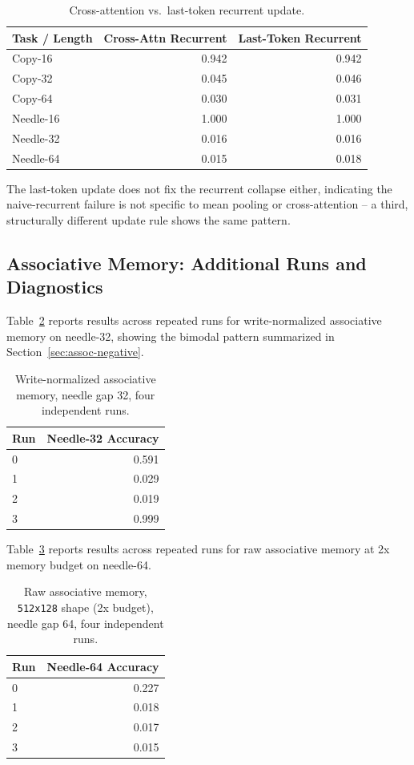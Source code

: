 \documentclass[10pt]{article} %
\begin{document}
\begin{table}[h]
\centering
\caption{Cross-attention vs.\ last-token recurrent update.}
\label{tab:lasttoken}
\begin{tabular}{lrr}
\toprule
Task / Length & Cross-Attn Recurrent & Last-Token Recurrent \\
\midrule
Copy-16   & 0.942 & 0.942 \\
Copy-32   & 0.045 & 0.046 \\
Copy-64   & 0.030 & 0.031 \\
Needle-16 & 1.000 & 1.000 \\
Needle-32 & 0.016 & 0.016 \\
Needle-64 & 0.015 & 0.018 \\
\bottomrule
\end{tabular}
\end{table}

The last-token update does not fix the recurrent collapse either, indicating
the naive-recurrent failure is not specific to mean pooling or
cross-attention -- a third, structurally different update rule shows the
same pattern.

\subsection{Associative Memory: Additional Runs and Diagnostics}

Table~\ref{tab:assoc_needle32} reports results across repeated runs for
write-normalized associative memory on needle-32, showing the bimodal
pattern summarized in Section~\ref{sec:assoc-negative}.

\begin{table}[h]
\centering
\caption{Write-normalized associative memory, needle gap 32, four independent runs.}
\label{tab:assoc_needle32}
\begin{tabular}{lr}
\toprule
Run & Needle-32 Accuracy \\
\midrule
0 & 0.591 \\
1 & 0.029 \\
2 & 0.019 \\
3 & 0.999 \\
\bottomrule
\end{tabular}
\end{table}

Table~\ref{tab:assoc_needle64_2x} reports results across repeated runs for raw
associative memory at 2x memory budget on needle-64.

\begin{table}[h]
\centering
\caption{Raw associative memory, \texttt{512x128} shape (2x budget),
needle gap 64, four independent runs.}
\label{tab:assoc_needle64_2x}
\begin{tabular}{lr}
\toprule
Run & Needle-64 Accuracy \\
\midrule
0 & 0.227 \\
1 & 0.018 \\
2 & 0.017 \\
3 & 0.015 \\
\bottomrule
\end{tabular}
\end{table}
\end{document}
